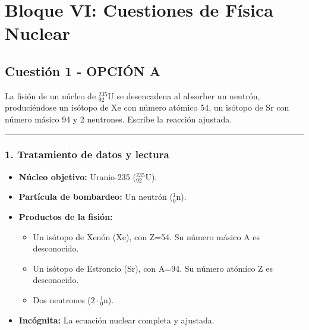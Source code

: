 \newpage

\section{Bloque VI: Cuestiones de Física Nuclear}
\label{sec:nuclear_2006_jun_ord}

\subsection{Cuestión 1 - OPCIÓN A}
\label{subsec:6A_2006_jun_ord}

\begin{cajaenunciado}
La fisión de un núcleo de ${}^{235}_{92}\text{U}$ se desencadena al absorber un neutrón, produciéndose un isótopo de Xe con número atómico 54, un isótopo de Sr con número másico 94 y 2 neutrones. Escribe la reacción ajustada.
\end{cajaenunciado}
\hrule

\subsubsection*{1. Tratamiento de datos y lectura}
\begin{itemize}
    \item \textbf{Núcleo objetivo:} Uranio-235 (${}^{235}_{92}\text{U}$).
    \item \textbf{Partícula de bombardeo:} Un neutrón (${}^{1}_{0}\text{n}$).
    \item \textbf{Productos de la fisión:}
    \begin{itemize}
        \item Un isótopo de Xenón (Xe), con Z=54. Su número másico A es desconocido.
        \item Un isótopo de Estroncio (Sr), con A=94. Su número atómico Z es desconocido.
        \item Dos neutrones ($2 \cdot {}^{1}_{0}\text{n}$).
    \end{itemize}
    \item \textbf{Incógnita:} La ecuación nuclear completa y ajustada.
\end{itemize}

